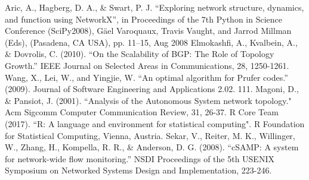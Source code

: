 \documentclass[conference]{IEEEtran}
\begin{document}
\begin{thebibliography}{00}
 Aric, A., Hagberg, D. A., \& Swart, P. J. ``Exploring network structure, dynamics, and function using NetworkX”, in Proceedings of the 7th Python in Science Conference (SciPy2008), Gäel Varoquaux, Travis Vaught, and Jarrod Millman (Eds), (Pasadena, CA USA), pp. 11–15, Aug 2008
 Elmokashfi, A., Kvalbein, A., \& Dovrolis, C. (2010). ``On the Scalability of BGP: The Role of Topology Growth.” IEEE Journal on Selected Areas in Communications, 28, 1250-1261.
 Wang, X., Lei, W., and Yingjie, W. ``An optimal algorithm for Prufer codes.” (2009). Journal of Software Engineering and Applications 2.02. 111.
 Magoni, D., \& Pansiot, J. (2001). ``Analysis of the Autonomous System network topology." Acm Sigcomm Computer Communication Review, 31, 26-37.
 R Core Team (2017). ``R: A language and environment for statistical computing". R Foundation for Statistical Computing, Vienna, Austria.
 Sekar, V., Reiter, M. K., Willinger, W., Zhang, H., Kompella, R. R., \& Anderson, D. G. (2008). ``cSAMP: A system for network-wide flow monitoring.” NSDI Proceedings of the 5th USENIX Symposium on Networked Systems Design and Implementation, 223-246.

\end{thebibliography}
\end{document}
